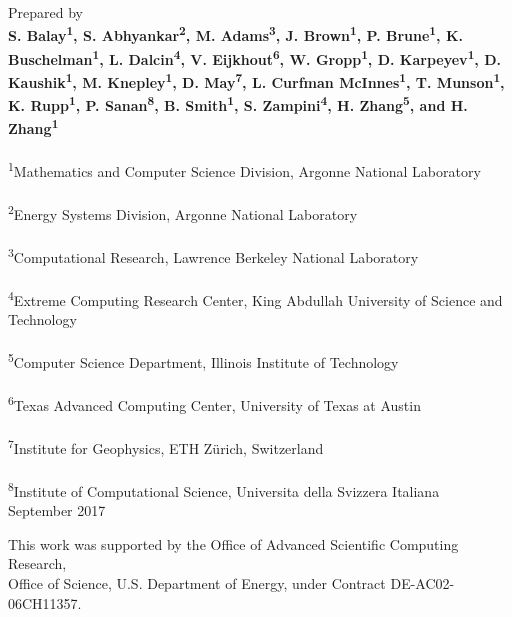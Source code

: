 \vspace*{1in}
\noindent Prepared by \\
{\bf S. Balay\textsuperscript{1}, S. Abhyankar\textsuperscript{2}, M. Adams\textsuperscript{3}, J. Brown\textsuperscript{1}, P. Brune\textsuperscript{1}, K. Buschelman\textsuperscript{1},
L. Dalcin\textsuperscript{4}, V. Eijkhout\textsuperscript{6}, W. Gropp\textsuperscript{1}, D. Karpeyev\textsuperscript{1},
D. Kaushik\textsuperscript{1}, M. Knepley\textsuperscript{1}, D. May\textsuperscript{7}, L. Curfman McInnes\textsuperscript{1}, T. Munson\textsuperscript{1},
K. Rupp\textsuperscript{1}, P. Sanan\textsuperscript{8}, B. Smith\textsuperscript{1}, S. Zampini\textsuperscript{4}, H. Zhang\textsuperscript{5}, and H. Zhang\textsuperscript{1}}\\
\\
\textsuperscript{1}Mathematics and Computer Science Division, Argonne National Laboratory \\
\\
\textsuperscript{2}Energy Systems Division, Argonne National Laboratory \\
\\
\textsuperscript{3}Computational Research, Lawrence Berkeley National Laboratory \\
\\
\textsuperscript{4}Extreme Computing Research Center, King Abdullah University of Science and Technology\\
\\
\textsuperscript{5}Computer Science Department, Illinois Institute of Technology\\
\\
\textsuperscript{6}Texas Advanced Computing Center, University of Texas at Austin\\
\\
\textsuperscript{7}Institute for Geophysics, ETH Zürich, Switzerland\\
\\
\textsuperscript{8}Institute of Computational Science, Universita della Svizzera Italiana\\


\vspace*{30pt}
\noindent September 2017

\vspace*{20pt}
\noindent This work was supported by the Office of Advanced Scientific Computing Research, \\
Office of Science, U.S. Department of Energy, under Contract DE-AC02-06CH11357.


